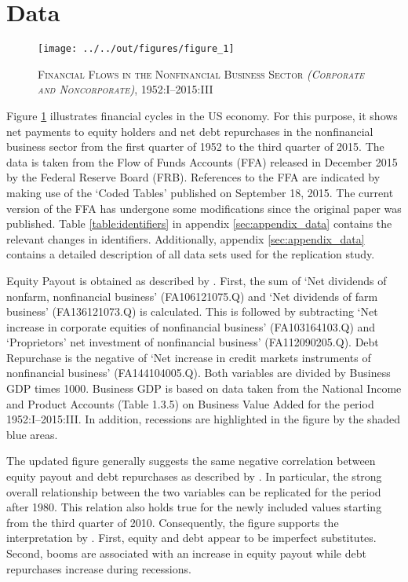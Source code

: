 \section{Data}
\label{sec:data}

\begin{figure}[t]
    
    \centering

    \texttt{[image: ../../out/figures/figure\_1]}

    \caption{\textsc{Financial Flows in the Nonfinancial Business Sector \textit{(Corporate and Noncorporate)}}, 1952:I--2015:III}
    
    \label{fig:figure_1}

\end{figure}

Figure \ref{fig:figure_1} illustrates financial cycles in the US economy. For this purpose, it shows net payments to equity holders and net debt repurchases in the nonfinancial business sector from the first quarter of 1952 to the third quarter of 2015. The data is taken from the Flow of Funds Accounts (FFA) released in December 2015 by the Federal Reserve Board (FRB). References to the FFA are indicated by making use of the ‘Coded Tables’ published on September 18, 2015. The current version of the FFA has undergone some modifications since the original paper was published. Table \ref{table:identifiers} in appendix \ref{sec:appendix_data} contains the relevant changes in identifiers. Additionally, appendix \ref{sec:appendix_data} contains a detailed description of all data sets used for the replication study.

Equity Payout is obtained as described by \citeauthor{JERMANNfinancial}. First, the sum of ‘Net dividends of nonfarm, nonfinancial business’ (FA106121075.Q) and ‘Net dividends of farm business’ (FA136121073.Q) is calculated. This is followed by subtracting ‘Net increase in corporate equities of nonfinancial business’ (FA103164103.Q) and ‘Proprietors’ net investment of nonfinancial business’ (FA112090205.Q). Debt Repurchase is the negative of ‘Net increase in credit markets instruments of nonfinancial business’ (FA144104005.Q). Both variables are divided by Business GDP times 1000. Business GDP is based on data taken from the National Income and Product Accounts (Table 1.3.5) on Business Value Added for the period 1952:I--2015:III. In addition, recessions are highlighted in the figure by the shaded blue areas.

The updated figure generally suggests the same negative correlation between equity payout and debt repurchases as described by \citeauthor{JERMANNfinancial}. In particular, the strong overall relationship between the two variables can be replicated for the period after 1980. This relation also holds true for the newly included values starting from the third quarter of 2010. 
Consequently, the figure supports the interpretation by \citeauthor{JERMANNfinancial}. First, equity and debt appear to be imperfect substitutes. Second, booms are associated with an increase in equity payout while debt repurchases increase during recessions.
